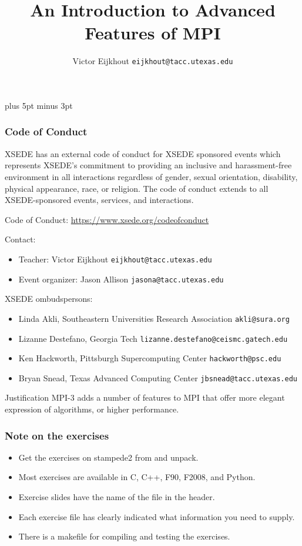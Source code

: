 \documentclass[11pt,headernav]{beamer}
\def\Location{}%
\begin{document}
\parskip=10pt plus 5pt minus 3pt

\title{An Introduction to Advanced Features of MPI}
\author{Victor Eijkhout {\tt eijkhout@tacc.utexas.edu}}
\date{\Location}

\begin{frame}
  \titlepage
\end{frame}

\begin{frame}\frametitle{Code of Conduct}
  \scriptsize
  XSEDE has an external code of conduct for XSEDE sponsored events
  which represents XSEDE's commitment to providing an inclusive and
  harassment-free environment in all interactions regardless of
  gender, sexual orientation, disability, physical appearance, race,
  or religion. The code of conduct extends to all XSEDE-sponsored
  events, services, and interactions.

  Code of Conduct: \url{https://www.xsede.org/codeofconduct}

  Contact:
  \begin{itemize}
  \item Teacher: Victor Eijkhout \texttt{eijkhout@tacc.utexas.edu}\\
  \item  Event organizer: Jason Allison  \texttt{jasona@tacc.utexas.edu}
  \end{itemize}
  XSEDE ombudspersons:
  \begin{itemize}
  \item
    Linda Akli, Southeastern Universities Research Association
    \texttt{akli@sura.org}
  \item 
    Lizanne Destefano, Georgia Tech
    \texttt{lizanne.destefano@ceismc.gatech.edu}
  \item 
    Ken Hackworth, Pittsburgh Supercomputing Center \texttt{hackworth@psc.edu}
  \item 
    Bryan Snead, Texas Advanced Computing Center
    \texttt{jbsnead@tacc.utexas.edu}
  \end{itemize}
\end{frame}

\begin{frame}{Justification}
  MPI-3 adds a number of features to MPI that offer more elegant
  expression of algorithms, or higher performance.
\end{frame}

\begin{frame}[containsverbatim]\frametitle{Note on the exercises}
  \begin{itemize}
  \item Get the exercises on stampede2 from
     and unpack.
  \item Most exercises are available in C, C++, F90, F2008, and Python.
  \item Exercise slides have the name of the file in the header.
  \item Each exercise file has clearly indicated what information you
    need to supply.
  \item There is a makefile for compiling and testing the exercises.
  \end{itemize}
\end{frame}
\end{document}
